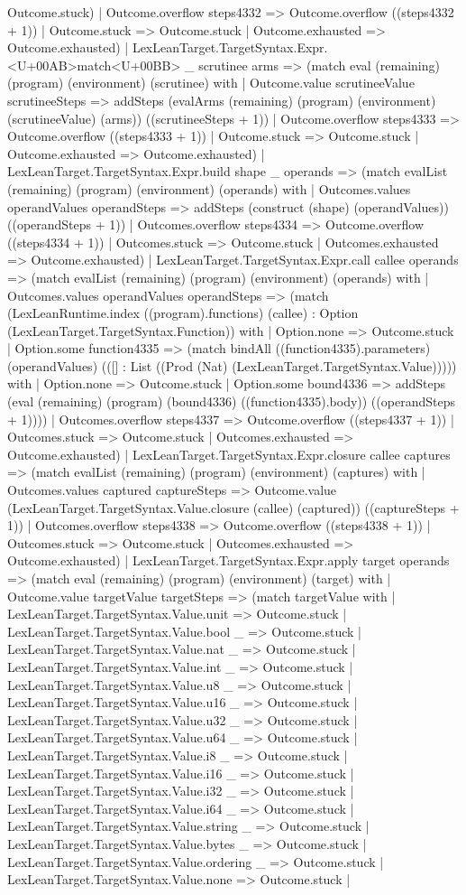 \documentclass[11pt]{article}
\begin{document}
Outcome.stuck) | Outcome.overflow steps4332 => Outcome.overflow ((steps4332 + 1)) | Outcome.stuck => Outcome.stuck | Outcome.exhausted => Outcome.exhausted) | LexLeanTarget.TargetSyntax.Expr.<U+00AB>match<U+00BB> \_ scrutinee arms => (match eval (remaining) (program) (environment) (scrutinee) with | Outcome.value scrutineeValue scrutineeSteps => addSteps (evalArms (remaining) (program) (environment) (scrutineeValue) (arms)) ((scrutineeSteps + 1)) | Outcome.overflow steps4333 => Outcome.overflow ((steps4333 + 1)) | Outcome.stuck => Outcome.stuck | Outcome.exhausted => Outcome.exhausted) | LexLeanTarget.TargetSyntax.Expr.build shape \_ operands => (match evalList (remaining) (program) (environment) (operands) with | Outcomes.values operandValues operandSteps => addSteps (construct (shape) (operandValues)) ((operandSteps + 1)) | Outcomes.overflow steps4334 => Outcome.overflow ((steps4334 + 1)) | Outcomes.stuck => Outcome.stuck | Outcomes.exhausted => Outcome.exhausted) | LexLeanTarget.TargetSyntax.Expr.call callee operands => (match evalList (remaining) (program) (environment) (operands) with | Outcomes.values operandValues operandSteps => (match (LexLeanRuntime.index ((program).functions) (callee) : Option (LexLeanTarget.TargetSyntax.Function)) with | Option.none => Outcome.stuck | Option.some function4335 => (match bindAll ((function4335).parameters) (operandValues) (([] : List ((Prod (Nat) (LexLeanTarget.TargetSyntax.Value))))) with | Option.none => Outcome.stuck | Option.some bound4336 => addSteps (eval (remaining) (program) (bound4336) ((function4335).body)) ((operandSteps + 1)))) | Outcomes.overflow steps4337 => Outcome.overflow ((steps4337 + 1)) | Outcomes.stuck => Outcome.stuck | Outcomes.exhausted => Outcome.exhausted) | LexLeanTarget.TargetSyntax.Expr.closure callee captures => (match evalList (remaining) (program) (environment) (captures) with | Outcomes.values captured captureSteps => Outcome.value (LexLeanTarget.TargetSyntax.Value.closure (callee) (captured)) ((captureSteps + 1)) | Outcomes.overflow steps4338 => Outcome.overflow ((steps4338 + 1)) | Outcomes.stuck => Outcome.stuck | Outcomes.exhausted => Outcome.exhausted) | LexLeanTarget.TargetSyntax.Expr.apply target operands => (match eval (remaining) (program) (environment) (target) with | Outcome.value targetValue targetSteps => (match targetValue with | LexLeanTarget.TargetSyntax.Value.unit => Outcome.stuck | LexLeanTarget.TargetSyntax.Value.bool \_ => Outcome.stuck | LexLeanTarget.TargetSyntax.Value.nat \_ => Outcome.stuck | LexLeanTarget.TargetSyntax.Value.int \_ => Outcome.stuck | LexLeanTarget.TargetSyntax.Value.u8 \_ => Outcome.stuck | LexLeanTarget.TargetSyntax.Value.u16 \_ => Outcome.stuck | LexLeanTarget.TargetSyntax.Value.u32 \_ => Outcome.stuck | LexLeanTarget.TargetSyntax.Value.u64 \_ => Outcome.stuck | LexLeanTarget.TargetSyntax.Value.i8 \_ => Outcome.stuck | LexLeanTarget.TargetSyntax.Value.i16 \_ => Outcome.stuck | LexLeanTarget.TargetSyntax.Value.i32 \_ => Outcome.stuck | LexLeanTarget.TargetSyntax.Value.i64 \_ => Outcome.stuck | LexLeanTarget.TargetSyntax.Value.string \_ => Outcome.stuck | LexLeanTarget.TargetSyntax.Value.bytes \_ => Outcome.stuck | LexLeanTarget.TargetSyntax.Value.ordering \_ => Outcome.stuck | LexLeanTarget.TargetSyntax.Value.none => Outcome.stuck | 
\end{document}
